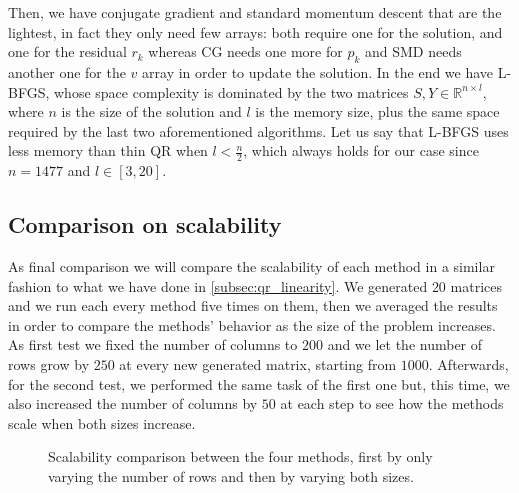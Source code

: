 \noindent Then, we have conjugate gradient and standard momentum descent that are the lightest, in fact they only need few arrays: both require one for the solution, and one for the residual $r_k$ whereas CG needs one more for $p_k$ and SMD needs another one for the $v$ array in order to update the solution. In the end we have L-BFGS, whose space complexity is dominated by the two matrices $S,Y \in \mathbb{R}^{n\times l}$, where $n$ is the size of the solution and $l$ is the memory size, plus the same space required by the last two aforementioned algorithms. Let us say that L-BFGS uses less memory than thin QR when $l < \frac{n}{2}$, which always holds for our case since $n=1477$ and $l \in [3, 20]$.

\subsection{Comparison on scalability}
As final comparison we will compare the scalability of each method in a similar fashion to what we have done in \ref{subsec:qr_linearity}. We generated $20$ matrices and we run each every method five times on them, then we averaged the results in order to compare the methods' behavior as the size of the problem increases. As first test we fixed the number of columns to $200$ and we let the number of rows grow by $250$ at every new generated matrix, starting from $1000$. Afterwards, for the second test, we performed the same task of the first one but, this time, we also increased the number of columns by $50$ at each step to see how the methods scale when both sizes increase.
\begin{figure}[H]
    \centering
    \caption{Scalability comparison between the four methods, first by only varying the number of rows and then by varying both sizes.}
    \label{fig:comparison_scalability}
\end{figure}


